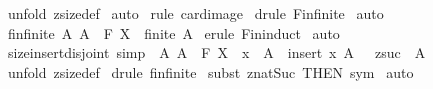 \begin{isabellebody}
%
\isadelimproof
%
\endisadelimproof
%
\isatagproof
{}\isamarkupfalse%
\ {\isacharparenleft}unfold\ zsize{\isacharunderscore}def{\isacharparenright}\isanewline
{}\isamarkupfalse%
\ auto\isanewline
{}\isamarkupfalse%
\ {\isacharparenleft}rule\ card{\isacharunderscore}image{\isacharparenright}\isanewline
{}\isamarkupfalse%
\ {\isacharparenleft}drule\ Fin{\isacharunderscore}finite{\isacharparenright}\isanewline
{}\isamarkupfalse%
\ auto\isanewline
{}\isamarkupfalse%
%
\endisatagproof
{\isafoldproof}%
%
\isadelimproof
\isanewline
%
\endisadelimproof
\isanewline
\isanewline
\isanewline
\isanewline
\isanewline
{}\isamarkupfalse%
\ fin{\isacharunderscore}finite{\isacharcolon}\ {\isachardoublequoteopen}{\isacharbang}{\isacharbang}A{\isachardot}\ A\ {\isacharcolon}\ {\isacharpercent}F\ X\ {\isacharequal}{\isacharequal}{\isachargreater}\ finite\ A{\isachardoublequoteclose}\isanewline
%
\isadelimproof
%
\endisadelimproof
%
\isatagproof
{}\isamarkupfalse%
\ {\isacharparenleft}erule\ Fin{\isacharunderscore}induct{\isacharparenright}\isanewline
{}\isamarkupfalse%
\ auto\isanewline
{}\isamarkupfalse%
%
\endisatagproof
{\isafoldproof}%
%
\isadelimproof
\isanewline
%
\endisadelimproof
\isanewline
{}\isamarkupfalse%
\ size{\isacharunderscore}insert{\isacharunderscore}disjoint\ {\isacharbrackleft}simp{\isacharbrackright}{\isacharcolon}\ \ {\isachardoublequoteopen}{\isacharbang}{\isacharbang}A{\isachardot}\ {\isacharbrackleft}{\isacharbar}A\ {\isacharcolon}\ {\isacharpercent}F\ X\ {\isacharsemicolon}\ x\ {\isachartilde}{\isacharcolon}\ A{\isacharbar}{\isacharbrackright}\ {\isacharequal}{\isacharequal}{\isachargreater}\ {\isacharhash}{\isacharparenleft}insert\ x\ A{\isacharparenright}\ {\isacharequal}\ \ zsuc\ {\isacharparenleft}{\isacharhash}\ A{\isacharparenright}{\isachardoublequoteclose}\isanewline
%
\isadelimproof
%
\endisadelimproof
%
\isatagproof
{}\isamarkupfalse%
\ {\isacharparenleft}unfold\ zsize{\isacharunderscore}def{\isacharparenright}\isanewline
{}\isamarkupfalse%
\ {\isacharparenleft}drule\ fin{\isacharunderscore}finite{\isacharparenright}\isanewline
{}\isamarkupfalse%
\ {\isacharparenleft}subst\ znat{\isacharunderscore}Suc\ {\isacharbrackleft}THEN\ sym{\isacharbrackright}{\isacharparenright}\isanewline
{}\isamarkupfalse%
\ auto\isanewline
{}\isamarkupfalse%
%
\endisatagproof
{\isafoldproof}%
%
\isadelimproof
\isanewline

\end{isabellebody}
